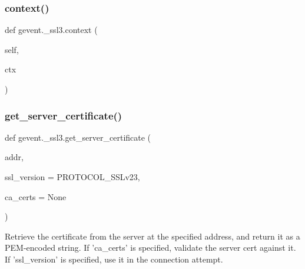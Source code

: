 \mbox{\label{namespacegevent_1_1__ssl3_aa2a4f272f8d13968e6b9b4cf9a0761b7}} 
\subsubsection{\texorpdfstring{context()}{context()}\hspace{0.1cm}{\footnotesize\ttfamily [2/2]}}
{\footnotesize\ttfamily def gevent.\+\_\+ssl3.\+context (\begin{DoxyParamCaption}\item[{}]{self,  }\item[{}]{ctx }\end{DoxyParamCaption})}

\mbox{\label{namespacegevent_1_1__ssl3_aa2f28712a446a9d6e1a9eb668cb6e8d5}} 
\subsubsection{\texorpdfstring{get\+\_\+server\+\_\+certificate()}{get\_server\_certificate()}}
{\footnotesize\ttfamily def gevent.\+\_\+ssl3.\+get\+\_\+server\+\_\+certificate (\begin{DoxyParamCaption}\item[{}]{addr,  }\item[{}]{ssl\+\_\+version = {\ttfamily PROTOCOL\+\_\+SSLv23},  }\item[{}]{ca\+\_\+certs = {\ttfamily None} }\end{DoxyParamCaption})}

\begin{DoxyVerb}Retrieve the certificate from the server at the specified address,
and return it as a PEM-encoded string.
If 'ca_certs' is specified, validate the server cert against it.
If 'ssl_version' is specified, use it in the connection attempt.\end{DoxyVerb}
 \mbox{\label{namespacegevent_1_1__ssl3_a88a40f6db85f505af09e2da9cf72c088}} 
